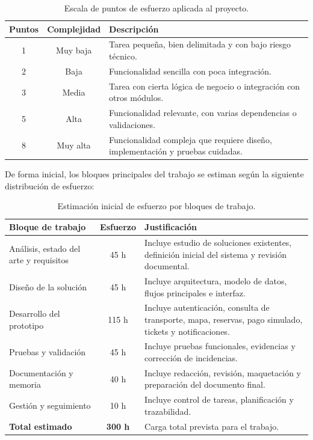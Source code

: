 \begin{table}[h!]
\centering
\small
\begin{tabular}{|c|c|p{8.5cm}|}
\hline
\textbf{Puntos} & \textbf{Complejidad} & \textbf{Descripción} \\ \hline
1 & Muy baja & Tarea pequeña, bien delimitada y con bajo riesgo técnico. \\ \hline
2 & Baja & Funcionalidad sencilla con poca integración. \\ \hline
3 & Media & Tarea con cierta lógica de negocio o integración con otros módulos. \\ \hline
5 & Alta & Funcionalidad relevante, con varias dependencias o validaciones. \\ \hline
8 & Muy alta & Funcionalidad compleja que requiere diseño, implementación y pruebas cuidadas. \\ \hline
\end{tabular}
\caption{Escala de puntos de esfuerzo aplicada al proyecto.}
\label{tab:puntos-esfuerzo}
\end{table}

De forma inicial, los bloques principales del trabajo se estiman según la siguiente distribución de esfuerzo:

\begin{table}[h!]
\centering
\small
\begin{tabular}{|p{5cm}|c|p{7cm}|}
\hline
\textbf{Bloque de trabajo} & \textbf{Esfuerzo} & \textbf{Justificación} \\ \hline
Análisis, estado del arte y requisitos & 45 h & Incluye estudio de soluciones existentes, definición inicial del sistema y revisión documental. \\ \hline
Diseño de la solución & 45 h & Incluye arquitectura, modelo de datos, flujos principales e interfaz. \\ \hline
Desarrollo del prototipo & 115 h & Incluye autenticación, consulta de transporte, mapa, reservas, pago simulado, tickets y notificaciones. \\ \hline
Pruebas y validación & 45 h & Incluye pruebas funcionales, evidencias y corrección de incidencias. \\ \hline
Documentación y memoria & 40 h & Incluye redacción, revisión, maquetación y preparación del documento final. \\ \hline
Gestión y seguimiento & 10 h & Incluye control de tareas, planificación y trazabilidad. \\ \hline
\textbf{Total estimado} & \textbf{300 h} & Carga total prevista para el trabajo. \\ \hline
\end{tabular}
\caption{Estimación inicial de esfuerzo por bloques de trabajo.}
\label{tab:esfuerzo}
\end{table}


